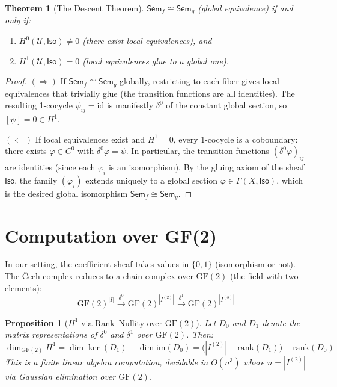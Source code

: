 \documentclass[11pt,a4paper]{report}
\theoremstyle{definition}
\theoremstyle{plain}
\newtheorem{theorem}[definition]{Theorem}
\newtheorem{proposition}[definition]{Proposition}
\newcommand{\iso}{\cong}
\newcommand{\covers}{\mathcal{U}}
\newcommand{\Sem}{\mathsf{Sem}}
\newcommand{\Iso}{\mathsf{Iso}}
\newcommand{\Hzero}{H^0}
\newcommand{\Hone}{H^1}
\begin{document}
\begin{theorem}[The Descent Theorem]
\label{thm:descent-full}
$\Sem_f \iso \Sem_g$ (global equivalence) if and only if:
\begin{enumerate}
  \item $\Hzero(\covers, \Iso) \neq 0$ (there exist local equivalences), and
  \item $\Hone(\covers, \Iso) = 0$ (local equivalences glue to a
    global one).
\end{enumerate}
\end{theorem}

\begin{proof}
$(\Rightarrow)$ If $\Sem_f \iso \Sem_g$ globally, restricting to
each fiber gives local equivalences that trivially glue (the
transition functions are all identities).  The resulting 1-cocycle
$\psi_{ij} = \mathrm{id}$ is manifestly $\delta^0$ of the constant
global section, so $[\psi] = 0 \in \Hone$.

$(\Leftarrow)$ If local equivalences exist and $\Hone = 0$, every
1-cocycle is a coboundary: there exists $\varphi \in C^0$ with
$\delta^0 \varphi = \psi$.  In particular, the transition functions
$(\delta^0 \varphi)_{ij}$ are identities (since each $\varphi_i$ is
an isomorphism).  By the gluing axiom of the sheaf $\Iso$, the
family $(\varphi_i)$ extends uniquely to a global section
$\varphi \in \Gamma(X, \Iso)$, which is the desired global
isomorphism $\Sem_f \iso \Sem_g$.
\end{proof}

\section{Computation over GF(2)}

In our setting, the coefficient sheaf takes values in $\{0, 1\}$
(isomorphism or not).  The \v{C}ech complex reduces to a chain
complex over $\mathrm{GF}(2)$ (the field with two elements):
\[
  \mathrm{GF}(2)^{|I|} \xrightarrow{\delta^0}
  \mathrm{GF}(2)^{|I^{(2)}|} \xrightarrow{\delta^1}
  \mathrm{GF}(2)^{|I^{(3)}|}
\]

\begin{proposition}[$\Hone$ via Rank--Nullity over $\mathrm{GF}(2)$]
\label{prop:h1-rank}
Let $D_0$ and $D_1$ denote the matrix representations of $\delta^0$
and $\delta^1$ over $\mathrm{GF}(2)$.  Then:
\[
  \dim_{\mathrm{GF}(2)} \Hone
  = \dim \ker(D_1) - \dim \mathrm{im}(D_0)
  = \bigl(|I^{(2)}| - \mathrm{rank}(D_1)\bigr) - \mathrm{rank}(D_0)
\]
This is a finite linear algebra computation, decidable in
$O(n^3)$ where $n = |I^{(2)}|$ via Gaussian elimination over
$\mathrm{GF}(2)$.
\end{proposition}
\end{document}

